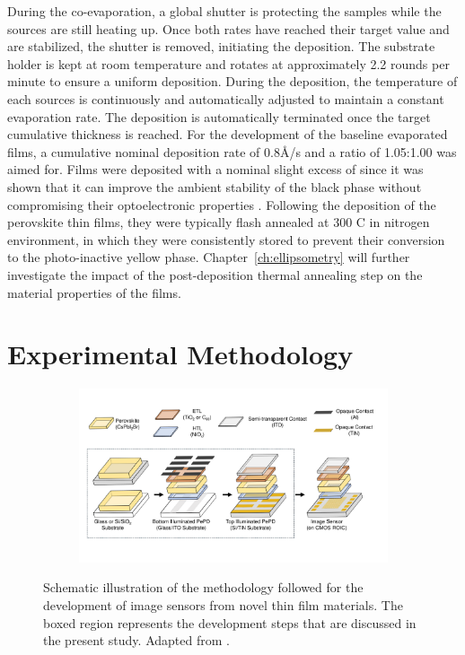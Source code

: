 During the co-evaporation, a global shutter is protecting the samples while the sources are still heating up. Once both rates have reached their target value and are stabilized, the shutter is removed, initiating the deposition. The substrate holder is kept at room temperature and rotates at approximately 2.2 rounds per minute to ensure a uniform deposition. During the deposition, the temperature of each sources is continuously and automatically adjusted to maintain a constant evaporation rate. The deposition is automatically terminated once the target cumulative thickness is reached. For the development of the baseline evaporated films, a cumulative nominal deposition rate of 0.8{\AA}/s and a  ratio of 1.05:1.00 was aimed for. Films were deposited with a nominal slight excess of  since it was shown that it can improve the ambient stability of the black phase without compromising their optoelectronic properties \cite{Ma2017TheCells}. Following the deposition of the perovskite thin films, they were typically flash annealed at 300 \degree C in nitrogen environment, in which they were consistently stored to prevent their conversion to the photo-inactive yellow phase. Chapter~\ref{ch:ellipsometry} will further investigate the impact of the post-deposition thermal annealing step on the material properties of the  films.


\section{Experimental Methodology}

\begin{figure}[htbp]
    \centering
    \begin{subfigure}[t]{0.99\textwidth} %
        \centering
        \includegraphics[width=\textwidth]{chapters/material_properties/images/methodology.pdf} %
    \end{subfigure}

    \caption[Schematic illustration of the methodology for the development of thin-film image sensors.]{Schematic illustration of the methodology followed for the development of image sensors from novel thin film materials. The boxed region represents the development steps that are discussed in the present study. Adapted from \cite{Malinowski2023ImageAbsorbers}.}
    \label{fig:ch2:methodology}
\end{figure}

